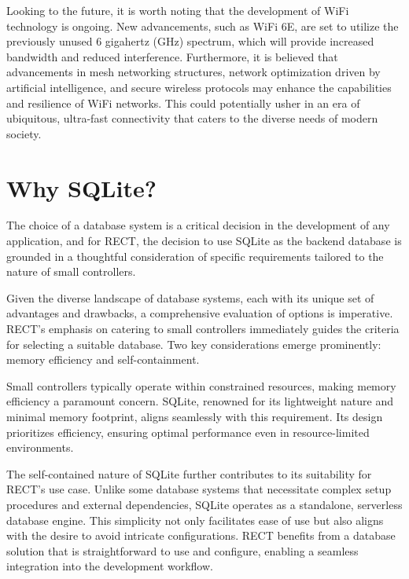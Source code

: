 Looking to the future, it is worth noting that the development of WiFi technology is ongoing. New advancements, such as WiFi 6E, are set to utilize the previously unused 6 gigahertz (GHz) spectrum, which will provide increased bandwidth and reduced interference. Furthermore, it is believed that advancements in mesh networking structures, network optimization driven by artificial intelligence, and secure wireless protocols may enhance the capabilities and resilience of WiFi networks. This could potentially usher in an era of ubiquitous, ultra-fast connectivity that caters to the diverse needs of modern society.


\section{Why SQLite?}
The choice of a database system is a critical decision in the development of any application, and for RECT, the decision to use SQLite as the backend database 
is grounded in a thoughtful consideration of specific requirements tailored to the nature of small controllers.\newline

Given the diverse landscape of database systems, each with its unique set of advantages and drawbacks, a comprehensive evaluation of options is imperative. 
RECT's emphasis on catering to small controllers immediately guides the criteria for selecting a suitable database. Two key considerations emerge prominently: 
memory efficiency and self-containment.\newline

Small controllers typically operate within constrained resources, making memory efficiency a paramount concern. SQLite, renowned for its lightweight nature and 
minimal memory footprint, aligns seamlessly with this requirement. Its design prioritizes efficiency, ensuring optimal performance even in resource-limited 
environments.\newline

The self-contained nature of SQLite further contributes to its suitability for RECT's use case. Unlike some database systems that necessitate complex setup 
procedures and external dependencies, SQLite operates as a standalone, serverless database engine. This simplicity not only facilitates ease of use but also 
aligns with the desire to avoid intricate configurations. RECT benefits from a database solution that is straightforward to use and configure, enabling a 
seamless integration into the development workflow.\newline

